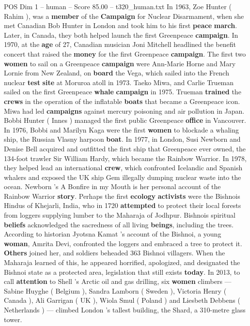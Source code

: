 \begin{textsample}{POS Dim 1 – human – Score 85.00 – t320\_human.txt}
In 1963, Zoe Hunter ( Rahim ), was a \textbf{member} of the \textbf{Campaign} for Nuclear Disarmament, when she met Canadian Bob Hunter in London and took him to his first \textbf{peace} \textbf{march}.
Later, in Canada, they both helped launch the first Greenpeace \textbf{campaign}.
In 1970, at the \textbf{age} of 27, Canadian musician Joni Mitchell headlined the benefit concert that raised the \textbf{money} for the first Greenpeace \textbf{campaign}.
The first two \textbf{women} to sail on a Greenpeace \textbf{campaign} were Ann-Marie Horne and Mary Lornie from New Zealand, on \textbf{board} the Vega, which sailed into the French nuclear \textbf{test} \textbf{site} at Moruroa atoll in 1973.
Taeko Miwa, and Carlie Trueman sailed on the first Greenpeace \textbf{whale} \textbf{campaign} in 1975.
Trueman \textbf{trained} the \textbf{crews} in the operation of the inflatable \textbf{boats} that became a Greenpeace icon.
Miwa had led \textbf{campaigns} against mercury poisoning and air pollution in Japan.
Bobbi Hunter ( Innes ) managed the first public Greenpeace \textbf{office} in Vancouver.
In 1976, Bobbi and Marilyn Kaga were the first \textbf{women} to blockade a whaling ship, the Russian Vlasny harpoon \textbf{boat}.
In 1977, in London, Susi Newborn and Denise Bell acquired and outfitted the first ship that Greenpeace ever owned, the 134-foot trawler Sir William Hardy, which became the Rainbow Warrior.
In 1978, they helped lead an international \textbf{crew}, which confronted Icelandic and Spanish whalers and exposed the UK ship Gem illegally dumping nuclear waste into the ocean.
Newborn ’s A Bonfire in my Mouth is her personal account of the Rainbow Warrior \textbf{story}.
Perhaps the first \textbf{ecology} \textbf{activists} were the Bishnois Hindus of Khejarli, India, who in 1720 \textbf{attempted} to protect their local forests from loggers supplying lumber to the Maharaja of Jodhpur.
Bishnois spiritual \textbf{beliefs} acknowledged the sacredness of all living \textbf{beings}, including the trees.
According to historian Jyotsna Kamat ’s account of the Bishnoi, a young \textbf{woman}, Amrita Devi, confronted the loggers and embraced a tree to protect it. \textbf{Others} joined her, and soldiers beheaded 363 Bishnoi villagers.
When the Maharaja learned of this, he appeared horrified, apologized, and designated the Bishnoi state as a protected area, legislation that still exists \textbf{today}.
In 2013, to call \textbf{attention} to Shell ’s Arctic oil and gas drilling, six \textbf{women} climbers — Sabine Huyghe ( Belgium ), Sandra Lamborn ( Sweden ), Victoria Henry ( Canada ), Ali Garrigan ( UK ), Wiola Smul ( Poland ) and Liesbeth Debbens ( Netherlands ) — climbed London ’s tallest building, the Shard, a 310-metre glass tower.

\end{textsample}
